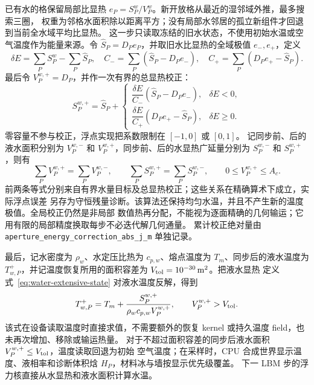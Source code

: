 \documentclass[UTF8,zihao=-4]{ctexart}
\newcommand{\code}[1]{\texttt{#1}}
\newcommand{\cellarea}{A_c}
\numberwithin{equation}{section}
\begin{document}
已有水的格保留局部比显热 $e_P=S_P^w/V_P^w$。新开放格从最近的湿邻域外推，最多搜索三圈，
权重为邻格水面积除以距离平方；没有局部水邻居的孤立新组件才回退到当前全水域平均比显热。
这一步只读取冻结的旧水状态，不使用初始水温或空气温度作为能量来源。令
$\widehat S_P=D_P e_P$，并取旧水比显热的全域极值 $e_-,e_+$，定义
\begin{equation}
 \delta E=\sum_P S_P^w-\sum_P\widehat S_P,\quad
 C_-=\sum_P(\widehat S_P-D_Pe_-),\quad
 C_+=\sum_P(D_Pe_+-\widehat S_P).
\end{equation}
最后令 $V_P^{w,+}=D_P$，并作一次有界的总显热校正：
\begin{equation}
 S_P^{w,+}=\widehat S_P+
 \begin{cases}
 \dfrac{\delta E}{C_-}(\widehat S_P-D_Pe_-),&\delta E<0,\\[2mm]
 \dfrac{\delta E}{C_+}(D_Pe_+-\widehat S_P),&\delta E\ge0.
 \end{cases}
\end{equation}
零容量不参与校正，浮点实现把系数限制在 $[-1,0]$ 或 $[0,1]$。
记同步前、后的液水面积分别为 $V_P^{w,-}$ 和 $V_P^{w,+}$，同步前、后的水显热广延量分别为
$S_P^{w,-}$ 和 $S_P^{w,+}$，则有
\begin{equation}
  \sum_PV_P^{w,+}=\sum_PV_P^{w,-},
  \qquad
  \sum_PS_P^{w,+}=\sum_PS_P^{w,-},
  \qquad 0\le V_P^{w,+}\le\cellarea.
  \label{eq:aperture-conservation}
\end{equation}
前两条等式分别来自有界水量目标及总显热校正；这些关系在精确算术下成立，实际浮点误差
另存为守恒残量诊断。该算法还保持均匀水温，并且不产生新的温度极值。全局校正仍然是非局部
数值热再分配，不能视为逐面精确的几何输运；它用有限的局部精度换取每步不必迭代解几何通量。
累计校正绝对量由 \code{aperture\_energy\_correction\_abs\_j\_m} 单独记录。

最后，记水密度为 $\rho_w$、水定压比热为 $c_{p,w}$、熔点温度为 $T_m$、同步后的液水温度为
$T_{w,P}^{+}$，并记温度恢复所用的面积容差为 $V_{\rm tol}=10^{-30}\,\mathrm m^2$。把液水显热
定义式~\eqref{eq:water-extensive-state} 对液水温度反解，得到
\begin{equation}
  T_{w,P}^{+}=T_m+\frac{S_P^{w,+}}{\rho_wc_{p,w}V_P^{w,+}},
  \qquad V_P^{w,+}>V_{\rm tol}.
  \label{eq:water-temperature-recovery}
\end{equation}
该式在设备读取温度时直接求值，不需要额外的恢复 kernel 或持久温度 field，也未再次增加、移除或输运热量。
对于不超过面积容差的同步后液水面积 $V_P^{w,+}\le V_{\rm tol}$，温度读取回退为初始
空气温度；在采样时，CPU 合成世界显示温度、液相率和诊断体积焓 $H_P$，材料冰与墙按显示优先级覆盖。
下一 LBM 步的浮力核直接从水显热和液水面积计算水温。
\end{document}
